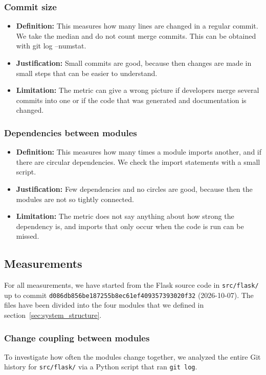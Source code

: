 \documentclass[12pt,a4paper]{article}
\begin{document}
\subsubsection{Commit size}
\begin{itemize}
\item \textbf{Definition:} This measures how many lines are changed in a regular commit. We take the median and do not count merge commits. This can be obtained with git log --numstat.
\item \textbf{Justification:} Small commits are good, because then changes are made in small steps that can be easier to understand.
\item \textbf{Limitation:} The metric can give a wrong picture if developers merge several commits into one or if the code that was generated and documentation is changed.
\end{itemize}

\subsubsection{Dependencies between modules}
\begin{itemize}
\item \textbf{Definition:} This measures how many times a module imports another, and if there are circular dependencies. We check the import statements with a small script.
\item \textbf{Justification:} Few dependencies and no circles are good, because then the modules are not so tightly connected.
\item \textbf{Limitation:} The metric does not say anything about how strong the dependency is, and imports that only occur when the code is run can be missed.
\end{itemize}

\subsection{Measurements}
For all measurements, we have started from the Flask source code in \texttt{src/flask/} up to commit \texttt{d086db856be187255b8ec61ef409357393020f32} (2026-10-07). The files have been divided into the four modules that we defined in section~\ref{sec:system_structure}.

\subsubsection{Change coupling between modules}
To investigate how often the modules change together, we analyzed the entire Git history for \texttt{src/flask/} via a Python script that ran \texttt{git log}.
\end{document}
